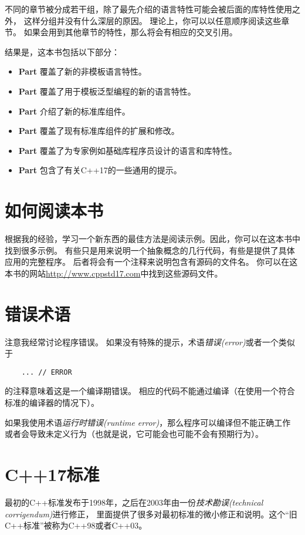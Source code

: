 不同的章节被分成若干组，除了最先介绍的语言特性可能会被后面的库特性使用之外，
这样分组并没有什么深层的原因。
理论上，你可以以任意顺序阅读这些章节。
如果会用到其他章节的特性，那么将会有相应的交叉引用。

结果是，这本书包括以下部分：
\begin{itemize}
    \item \textbf{Part \uppercase\expandafter{}}覆盖了新的非模板语言特性。
    \item \textbf{Part \uppercase\expandafter{}}覆盖了用于模板泛型编程的新的语言特性。
    \item \textbf{Part \uppercase\expandafter{}}介绍了新的标准库组件。
    \item \textbf{Part \uppercase\expandafter{}}覆盖了现有标准库组件的扩展和修改。
    \item \textbf{Part \uppercase\expandafter{}}覆盖了为专家例如基础库程序员设计的语言和库特性。
    \item \textbf{Part \uppercase\expandafter{}}包含了有关C++17的一些通用的提示。
\end{itemize}

\section{如何阅读本书}
根据我的经验，学习一个新东西的最佳方法是阅读示例。因此，你可以在这本书中找到很多示例。
有些只是用来说明一个抽象概念的几行代码，有些是提供了具体应用的完整程序。
后者将会有一个注释来说明包含有源码的文件名。
你可以在这本书的网站\url{http://www.cppstd17.com}中找到这些源码文件。

\section{错误术语}
注意我经常讨论程序错误。
如果没有特殊的提示，术语\emph{错误(error)}或者一个类似于
\begin{lstlisting}
    ... // ERROR
\end{lstlisting}
的注释意味着这是一个编译期错误。
相应的代码不能通过编译（在使用一个符合标准的编译器的情况下）。

如果我使用术语\emph{运行时错误(runtime error)}，那么程序可以编译但不能正确工作
或者会导致未定义行为（也就是说，它可能会也可能不会有预期行为）。

\section{C++17标准}
最初的C++标准发布于1998年，之后在2003年由一份\emph{技术勘误(technical corrigendum)}进行修正，
里面提供了很多对最初标准的微小修正和说明。这个“旧C++标准”被称为C++98或者C++03。

